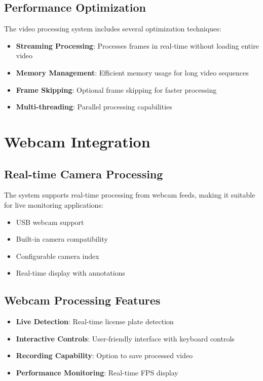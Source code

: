 \documentclass[12pt,a4paper]{article}
\begin{document}
\subsection{Performance Optimization}

The video processing system includes several optimization techniques:

\begin{itemize}
    \item \textbf{Streaming Processing}: Processes frames in real-time without loading entire video
    \item \textbf{Memory Management}: Efficient memory usage for long video sequences
    \item \textbf{Frame Skipping}: Optional frame skipping for faster processing
    \item \textbf{Multi-threading}: Parallel processing capabilities
\end{itemize}

\section{Webcam Integration}

\subsection{Real-time Camera Processing}

The system supports real-time processing from webcam feeds, making it suitable for live monitoring applications:

\begin{itemize}
    \item USB webcam support
    \item Built-in camera compatibility
    \item Configurable camera index
    \item Real-time display with annotations
\end{itemize}

\subsection{Webcam Processing Features}

\begin{itemize}
    \item \textbf{Live Detection}: Real-time license plate detection
    \item \textbf{Interactive Controls}: User-friendly interface with keyboard controls
    \item \textbf{Recording Capability}: Option to save processed video
    \item \textbf{Performance Monitoring}: Real-time FPS display
\end{itemize}
\end{document}
